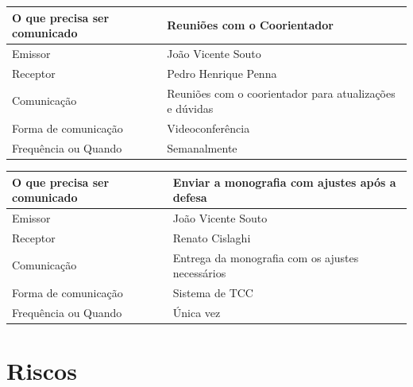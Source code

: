 \documentclass[
  12pt,       %
  openright,      %
  twoside,      %
  a4paper,      %
  english,      %
  brazil,       %
  ]{abntex2}
\begin{document}
\begin{center}
\begin{tabular}{|l|p{9cm}|}
\hline
    O que precisa ser comunicado & Reuniões com o Coorientador \\ \hline
    Emissor & João Vicente Souto \\ \hline
    Receptor & Pedro Henrique Penna \\ \hline
    Comunicação & Reuniões com o coorientador para atualizações e dúvidas \\ \hline
    Forma de comunicação & Videoconferência \\ \hline
    Frequência ou Quando & Semanalmente \\ \hline
\end{tabular}
\end{center}

\begin{center}
\begin{tabular}{|l|p{9cm}|}
\hline
    O que precisa ser comunicado & Enviar a monografia com ajustes após a defesa \\ \hline
    Emissor & João Vicente Souto \\ \hline
    Receptor & Renato Cislaghi \\ \hline
    Comunicação & Entrega da monografia com os ajustes necessários \\ \hline
    Forma de comunicação & Sistema de TCC \\ \hline
    Frequência ou Quando & Única vez \\ \hline
\end{tabular}
\end{center}

\newpage
\section{Riscos}
\end{document}
